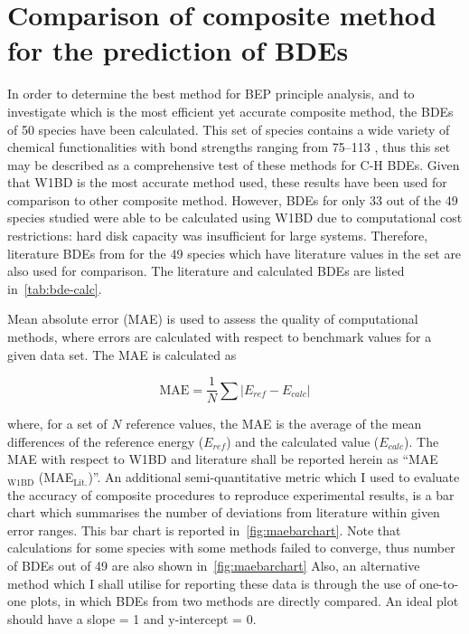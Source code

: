 \section{Comparison of composite method for the prediction of BDEs}

In order to determine the best method for BEP principle analysis, and to investigate which is the most efficient yet accurate composite method, the BDEs of 50 species have been calculated. This set of species contains a wide variety of chemical functionalities with bond strengths ranging from 75--113 \kcalmol, thus this set may be described as a comprehensive test of these methods for C-H BDEs. Given that W1BD is the most accurate method used, these results have been used for comparison to other composite method. However, BDEs for only 33 out of the 49 species studied were able to be calculated using W1BD due to computational cost restrictions: hard disk capacity was insufficient for large systems. Therefore, literature BDEs from \citet{Luo2002} for the 49 species which have literature values in the set are also used for comparison. The literature and calculated BDEs are listed in~\ref{tab:bde-calc}.

\begin{landscape}

\end{landscape}

Mean absolute error (MAE) is used to assess the quality of computational methods, where errors are calculated with respect to benchmark values for a given data set.\cite{Savin2014} The MAE is calculated as

\begin{equation}
  \mathrm{MAE} = \frac{1}{N} \sum | E_{ref} - E_{calc}|
\end{equation}

\noindent where, for a set of $N$ reference values, the MAE is the average of the mean differences of the reference energy ($E_{ref}$) and the calculated value ($E_{calc}$). The MAE with respect to W1BD and literature shall be reported herein as ``MAE$_{\mathrm{W1BD}}$ (MAE$_{\mathrm{Lit.}}$)''. An additional semi-quantitative metric which I used to evaluate the accuracy of composite procedures to reproduce experimental results, is a bar chart which summarises the number of deviations from literature within given error ranges. This bar chart is reported in~\ref{fig:maebarchart}. Note that calculations for some species with some methods failed to converge, thus number of BDEs out of 49 are also shown in~\ref{fig:maebarchart} Also, an alternative method which I shall utilise for reporting these data is through the use of one-to-one plots, in which BDEs from two methods are directly compared. An ideal plot should have a slope = 1 and y-intercept = 0.

